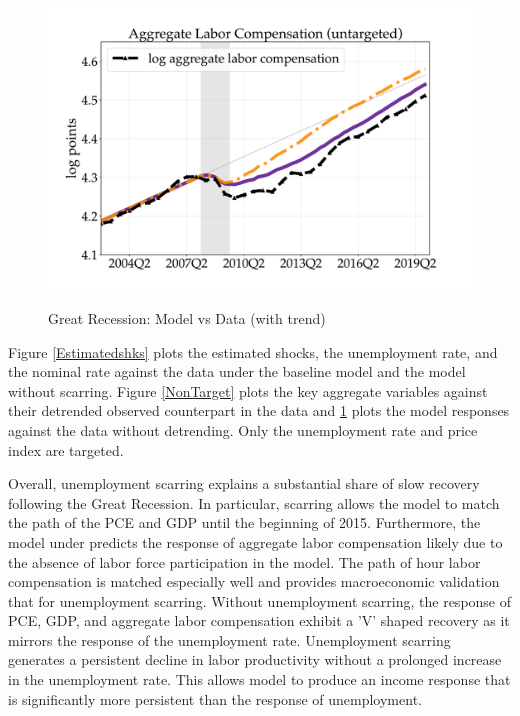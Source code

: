 \begin{figure}[H]
\begin{minipage}{0.51\textwidth}
\includegraphics[scale=.29]{text/chapter1/Figures/GR_sim/Cleaner/labor_comp_vs_data_large_new}
 \label{fig:f}
\end{minipage}
\caption{Great Recession: Model vs Data (with trend)}
\label{NonTarget_with_trend}
\end{figure}


Figure \ref{Estimatedshks} plots the estimated shocks, the unemployment rate, and the nominal rate against the data under the baseline model and the model without scarring. Figure \ref{NonTarget} plots the key aggregate variables against their detrended observed counterpart in the data and \ref{NonTarget_with_trend} plots the model responses against the data without detrending. Only the unemployment rate and price index are targeted. 

Overall, unemployment scarring explains a substantial share of slow recovery following the Great Recession. In particular, scarring allows the model to match the path of the PCE and GDP until the beginning of 2015. Furthermore, the model under predicts the response of aggregate labor compensation likely due to the absence of labor force participation in the model. The path of hour labor compensation is matched especially well and provides macroeconomic validation that for unemployment scarring. Without unemployment scarring, the response of PCE, GDP, and aggregate labor compensation exhibit a 'V' shaped recovery as it mirrors the response of the unemployment rate. Unemployment scarring generates a persistent decline in labor productivity without a prolonged increase in the unemployment rate. This allows model to produce an income response that is significantly more persistent than the response of unemployment. 





